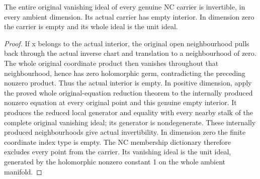\begin{theorem}
\label{hir:general-nc-whole-original-ideal-invertible}
\leanok
The entire original vanishing ideal of every genuine NC carrier is invertible,
in every ambient dimension. Its actual carrier has empty interior. In dimension
zero the carrier is empty and its whole ideal is the unit ideal.
\end{theorem}
\begin{proof}
If x belongs to the actual interior, the original open neighbourhood pulls
back through the actual inverse chart and translation to a neighbourhood of
zero. The whole original coordinate product then vanishes throughout that
neighbourhood, hence has zero holomorphic germ, contradicting the preceding
nonzero product. Thus the actual interior is empty. In positive dimension,
apply the proved whole original-equation reduction theorem to the internally
produced nonzero equation at every original point and this genuine empty
interior. It produces the reduced local generator and equality with every
nearby stalk of the complete original vanishing ideal; its generator is
nondegenerate. These internally produced neighbourhoods give actual
invertibility. In dimension zero the finite coordinate index type is empty.
The NC membership dictionary therefore excludes every point from the carrier.
Its vanishing ideal is the unit ideal, generated by the holomorphic nonzero
constant 1 on the whole ambient manifold.
\end{proof}

